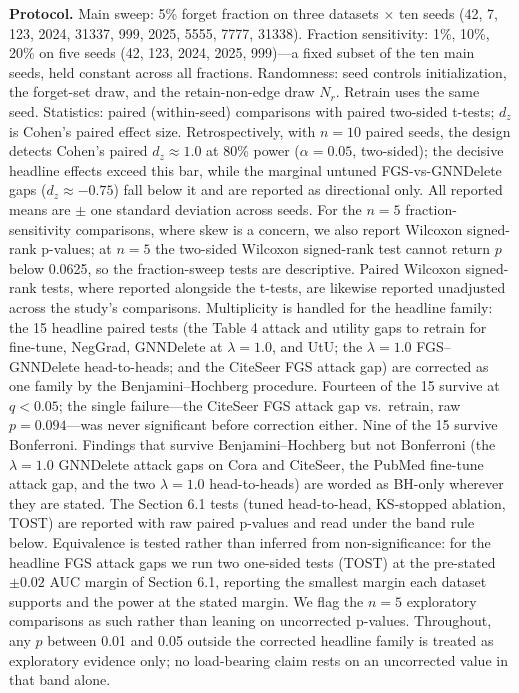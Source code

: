 \documentclass[pdflatex,sn-basic,Numbered]{sn-jnl}
\begin{document}
\textbf{Protocol.} Main sweep: 5\% forget fraction on three datasets $\times$ ten seeds (42, 7, 123, 2024, 31337, 999, 2025, 5555, 7777, 31338). Fraction sensitivity: 1\%, 10\%, 20\% on five seeds (42, 123, 2024, 2025, 999)---a fixed subset of the ten main seeds, held constant across all fractions. Randomness: seed controls initialization, the forget-set draw, and the retain-non-edge draw $N_r$. Retrain uses the same seed. Statistics: paired (within-seed) comparisons with paired two-sided t-tests; $d_z$ is Cohen's paired effect size. Retrospectively, with $n = 10$ paired seeds, the design detects Cohen's paired $d_z \approx 1.0$ at 80\% power ($\alpha = 0.05$, two-sided); the decisive headline effects exceed this bar, while the marginal untuned FGS-vs-GNNDelete gaps ($d_z \approx -0.75$) fall below it and are reported as directional only. All reported means are $\pm$ one standard deviation across seeds. For the $n = 5$ fraction-sensitivity comparisons, where skew is a concern, we also report Wilcoxon signed-rank p-values; at $n = 5$ the two-sided Wilcoxon signed-rank test cannot return $p$ below 0.0625, so the fraction-sweep tests are descriptive. Paired Wilcoxon signed-rank tests, where reported alongside the t-tests, are likewise reported unadjusted across the study's comparisons. Multiplicity is handled for the headline family: the 15 headline paired tests (the Table 4 attack and utility gaps to retrain for fine-tune, NegGrad, GNNDelete at $\lambda = 1.0$, and UtU; the $\lambda = 1.0$ FGS--GNNDelete head-to-heads; and the CiteSeer FGS attack gap) are corrected as one family by the Benjamini--Hochberg procedure. Fourteen of the 15 survive at $q < 0.05$; the single failure---the CiteSeer FGS attack gap vs.\ retrain, raw $p = 0.094$---was never significant before correction either. Nine of the 15 survive Bonferroni. Findings that survive Benjamini--Hochberg but not Bonferroni (the $\lambda = 1.0$ GNNDelete attack gaps on Cora and CiteSeer, the PubMed fine-tune attack gap, and the two $\lambda = 1.0$ head-to-heads) are worded as BH-only wherever they are stated. The Section 6.1 tests (tuned head-to-head, KS-stopped ablation, TOST) are reported with raw paired p-values and read under the band rule below. Equivalence is tested rather than inferred from non-significance: for the headline FGS attack gaps we run two one-sided tests (TOST) at the pre-stated $\pm 0.02$ AUC margin of Section 6.1, reporting the smallest margin each dataset supports and the power at the stated margin. We flag the $n = 5$ exploratory comparisons as such rather than leaning on uncorrected p-values. Throughout, any $p$ between 0.01 and 0.05 outside the corrected headline family is treated as exploratory evidence only; no load-bearing claim rests on an uncorrected value in that band alone.
\end{document}
